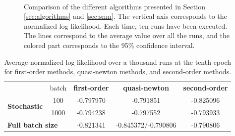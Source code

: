 \documentclass[conference]{IEEEtran}
\begin{document}
\begin{figure}[t]
    \centering
    ~
    ~
    \vspace{-0.2cm}
    \caption{Comparison of the different algorithms presented in Section \ref{sec:algorithms} and \ref{sec:snm}. The vertical axis corresponds to the normalized log likelihood. Each time, ten runs have been executed. The lines correspond to the average value over all the runs, and the colored part corresponds to the 95\% confidence interval.}
    \label{fig:comparison_algo}
    \vspace{-0.3cm}
\end{figure}

\begin{table}
\centering
\renewcommand\arraystretch{1.2}
\begin{tabular}{lc|ccc}
&\multicolumn{1}{c}{batch} & {\bf first-order} & {\bf quasi-newton} & {\bf second-order} \\ \cline{3-5}
\multirow{ 2}{*}{\bf Stochastic} & 100 & -0.797970 & -0.791851 & -0.825096 \\
& 1000 & -0.794238 & -0.797552 & -0.793933 \\
\multicolumn{2}{l|}{\bf Full batch size}  & -0.821341 & -0.845372/-0.790806 & -0.790806
\end{tabular}
\caption{\label{tab:comparison_algo} Average normalized log likelihood over a thousand runs at the tenth epoch for first-order methods, quasi-newton methods, and second-order methods.}
\vspace{-0.8cm}
\end{table}
\end{document}
